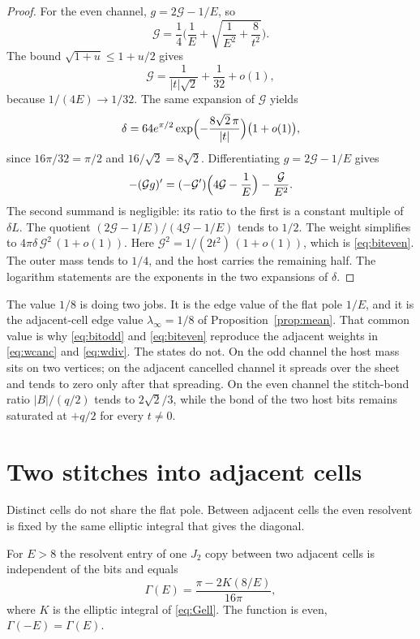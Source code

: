 \begin{proof}
For the even channel, \(g=2\mathcal{G}-1/E\), so
\[
\mathcal{G}
=\frac14\Biggl(\frac1E+\sqrt{\frac1{E^2}+\frac8{t^2}}\Biggr).
\]
The bound \(\sqrt{1+u}\le 1+u/2\) gives
\[
\mathcal{G}
=\frac{1}{|t|\sqrt{2}}+\frac{1}{32}+o(1),
\]
because \(1/(4E)\to 1/32\).
The same expansion of \(\mathcal{G}\) yields
\[
\delta
=64 e^{\pi/2}
\exp\Bigl(-\frac{8\sqrt{2}\,\pi}{|t|}\Bigr)
\bigl(1+o(1)\bigr),
\]
since \(16\pi/32=\pi/2\) and \(16/\sqrt{2}=8\sqrt{2}\).
Differentiating \(g=2\mathcal{G}-1/E\) gives
\[
-(\mathcal{G} g)'
=(-\mathcal{G}')\Bigl(4\mathcal{G}-\frac1E\Bigr)
-\frac{\mathcal{G}}{E^2}.
\]
The second summand is negligible: its ratio to the first is a constant
multiple of \(\delta L\).
The quotient \((2\mathcal{G}-1/E)/(4\mathcal{G}-1/E)\) tends to \(1/2\).
The weight simplifies to
\(4\pi\delta\,\mathcal{G}^2\,(1+o(1))\).
Here \(\mathcal{G}^2=1/(2t^2)\,(1+o(1))\), which is \eqref{eq:biteven}.
The outer mass tends to \(1/4\), and the host carries the remaining half.
The logarithm statements are the exponents in the two expansions of
\(\delta\).
\end{proof}

The value \(1/8\) is doing two jobs.
It is the edge value of the flat pole \(1/E\), and it is the adjacent-cell
edge value \(\lambda_\infty=1/8\) of Proposition~\ref{prop:mean}.
That common value is why \eqref{eq:bitodd} and \eqref{eq:biteven} reproduce
the adjacent weights in \eqref{eq:wcanc} and \eqref{eq:wdiv}.
The states do not.
On the odd channel the host mass sits on two vertices; on the adjacent
cancelled channel it spreads over the sheet and tends to zero only after
that spreading.
On the even channel the stitch-bond ratio \(|B|/(q/2)\) tends to
\(2\sqrt{2}/3\), while the bond of the two host bits remains saturated at
\(+q/2\) for every \(t\neq 0\).

\section{Two stitches into adjacent cells}
\label{sec:neighbor}

Distinct cells do not share the flat pole.
Between adjacent cells the even resolvent is fixed by the same elliptic
integral that gives the diagonal.

\begin{proposition}
\label{prop:neighbor}
For \(E>8\) the resolvent entry of one \(J_2\) copy between two adjacent
cells is independent of the bits and equals
\begin{equation}
\label{eq:Gamma}
\Gamma(E)=\frac{\pi-2K(8/E)}{16\pi},
\end{equation}
where \(K\) is the elliptic integral of \eqref{eq:Gell}.
The function is even, \(\Gamma(-E)=\Gamma(E)\).
\end{proposition}

